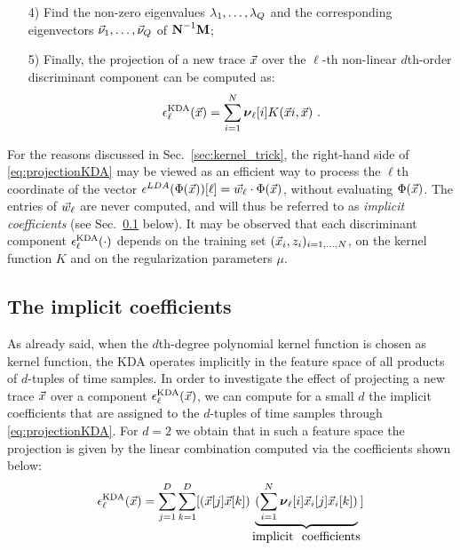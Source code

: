 \begin{itemize}
\item[4)]\label{point:eigs} Find the non-zero eigenvalues $\lambda_1, \dots, \lambda_Q$ and the corresponding eigenvectors $\vec{\nu}_1, \dots, \vec{\nu}_Q$ of $\textbf{N}^{-1}\textbf{M}$; 


\item[5)] Finally, the projection of a new trace $\vec{x}$ over the $\ell$-th non-linear $d$th-order discriminant component can be computed as:
\begin{equation}\label{eq:projectionKDA}
\epsilon^{\mathrm{KDA}}_{\ell}(\vec{x}) = \sum_{i=1}^{N}\boldsymbol{\nu}_\ell[i]K(\vec{x}{i}, \vec{x}) \mbox{ .}
\end{equation} 

\end{itemize}
For the reasons discussed in Sec.~\ref{sec:kernel_trick}, the right-hand side of \eqref{eq:projectionKDA} may be viewed as an efficient way to process the $\ell$th coordinate of the vector $\epsilon^{LDA}(\Phi(\vec{x}))[\ell] = \vec{w}_{\ell} \cdot \Phi(\vec{x})$,
without evaluating $\Phi(\vec{x})$. The entries of $\vec{w}_{\ell}$ are never computed, and will thus be referred to as \emph{implicit coefficients} (see Sec.~\ref{sec:implicit} below). It may be observed that each discriminant component $\epsilon^{\mathrm{KDA}}_{\ell}(\cdot)$ depends on the training set $(\vec{x}_i, z_i)_{i=1, \dots , N}$, on the kernel function $K$ and on the regularization parameters $\mu$.

\subsection{The implicit coefficients}\label{sec:implicit}
As already said, when the $d$th-degree  polynomial kernel function is chosen as kernel function, the KDA operates implicitly in the feature space of all products of $d$-tuples of time samples. In order to investigate the effect of projecting a new trace $\vec{x}$ over a component $\epsilon^{\mathrm{KDA}}_{\ell}(\vec{x})$, we can compute for a small $d$ the implicit coefficients that are assigned to the $d$-tuples of time samples through \eqref{eq:projectionKDA}. For $d=2$ we obtain that in such a feature space the projection is given by the linear combination computed via the coefficients shown below: 
\begin{equation}\label{eq:implicit}
\extract^{\mathrm{KDA}}_{\ell}(\vLeakVec) = \sum_{j=1}^\traceLength \sum_{k=1}^\traceLength[ (\vLeakVec[j]\vLeakVec[k])\underbrace{(\sum_{i=1}^{\nbTraces}\boldsymbol{\nu}_{\ell}[i] \vLeakVec_i[j]\vLeakVec_{i}[k])}_{\mbox{implicit \ coefficients}}]
\end{equation}




